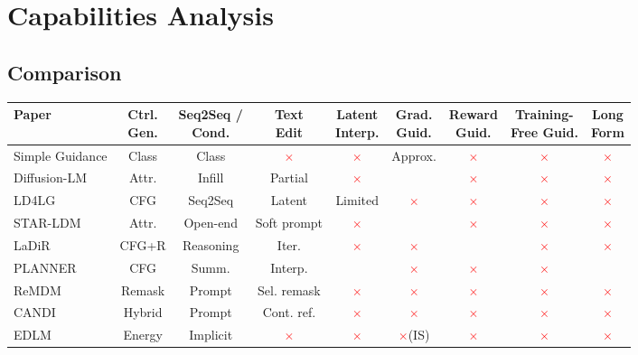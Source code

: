 \documentclass{article}
\newcommand{\gc}{\checkmark}
\newcommand{\rx}{\textcolor{red}{$\times$}}
\begin{document}
\section{Capabilities Analysis}

\subsection{Comparison}

\begin{table}[h]
\centering
\footnotesize
\setlength{\tabcolsep}{2pt}
\begin{adjustbox}{max width=\textwidth}
\begin{tabular}{@{}lcccccccc@{}}
\toprule
\textbf{Paper} & \makecell{\textbf{Ctrl.}\\\textbf{Gen.}} & \makecell{\textbf{Seq2Seq /}\\\textbf{Cond.}} & \makecell{\textbf{Text}\\\textbf{Edit}} & \makecell{\textbf{Latent}\\\textbf{Interp.}} & \makecell{\textbf{Grad.}\\\textbf{Guid.}} & \makecell{\textbf{Reward}\\\textbf{Guid.}} & \makecell{\textbf{Training-}\\\textbf{Free Guid.}} & \makecell{\textbf{Long}\\\textbf{Form}} \\
\midrule
Simple Guidance & Class & Class & \rx & \rx & Approx. & \rx & \rx & \rx \\
Diffusion-LM & Attr. & Infill & Partial & \rx & \gc & \rx & \rx & \rx \\
LD4LG & CFG & \gc Seq2Seq & Latent & Limited & \rx & \rx & \rx & \rx \\
STAR-LDM & Attr. & Open-end & Soft prompt & \rx & \gc & \rx & \rx & \rx \\
LaDiR & CFG+R & Reasoning & Iter. & \rx & \rx & \gc & \rx & \rx \\
PLANNER & CFG & Summ. & Interp. & \gc & \rx & \rx & \rx & \gc \\
ReMDM & Remask & Prompt & Sel. remask & \rx & \rx & \rx & \rx & \rx \\
CANDI & Hybrid & Prompt & Cont. ref. & \rx & \rx & \rx & \rx & \rx \\
EDLM & Energy & Implicit & \rx & \rx & \rx (IS) & \rx & \rx & \rx \\

\end{tabular}
\end{adjustbox}
\end{table}
\end{document}
